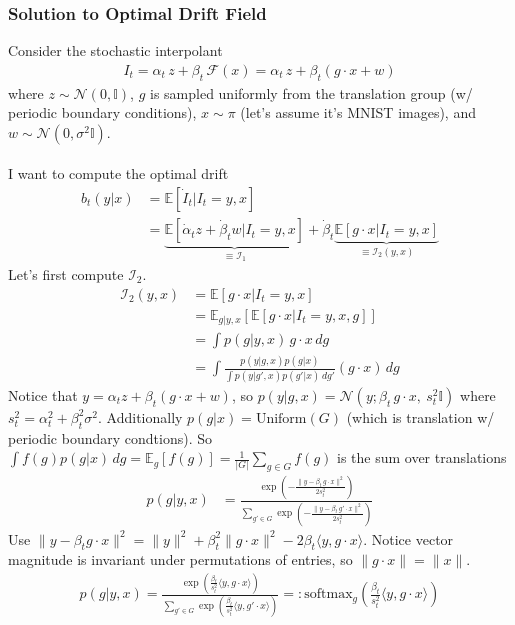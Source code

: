 \documentclass[12pt,fleqn]{article}
\numberwithin{equation}{section}
\begin{document}
\subsubsection{Solution to Optimal Drift Field}
Consider the stochastic interpolant
\begin{align}
	I_t = \alpha_t \, z + \beta_t \, \mathcal F(x) = \alpha_t \, z + \beta_t(g\cdot x + w)
\end{align}
where $z \sim \mathcal N(0, \mathbb I)$, $g$ is sampled uniformly from the translation group (w/ periodic boundary conditions), $x \sim \pi$ (let's assume it's MNIST images), and $w \sim \mathcal N(0, \sigma^2 \mathbb I)$.
\\
\\
I want to compute the optimal drift
\begin{align}
	b_t(y|x) & = \mathbb E[\dot I_t | I_t=y ,x]\\
	& = \underbrace{\mathbb E[\dot \alpha_t z + \dot \beta_t w| I_t = y,x]}_{\equiv \mathcal I_1} + \dot \beta_t \underbrace{\mathbb E[g \cdot x|I_t = y ,x]}_{\equiv \mathcal I_2(y,x)} \label{eqn:optdrift}
\end{align}
Let's first compute $\mathcal I_2$.
\begin{align}
	\mathcal I_2(y,x) & = \mathbb E[g \cdot x | I_t = y,x]\\
	& = \mathbb E_{g | y,x}[\mathbb E[g\cdot x | I_t = y, x, g]]\\
	& = \int p(g|y,x) \, g\cdot x \, dg\\
	& = \int \frac{p(y|g,x) p(g|x)}{\int p(y|g',x) p(g'|x)\, dg'} (g\cdot x) \, dg
\end{align}
Notice that $y = \alpha_t z + \beta_t (g \cdot x +w)$, so $p(y|g,x) = \mathcal N(y ; \beta_t \, g \cdot x , \ s_t^2 \mathbb I)$ where $s_t^2 = \alpha_t^2 + \beta_t^2 \sigma^2$. Additionally $p(g|x) = \text{Uniform}(G)$ (which is translation w/ periodic boundary condtions). So $\int f(g) p(g|x) \, dg = \mathbb E_g[f(g)] = \frac{1}{|G|} \sum_{g \in G} f(g)$ is the sum over translations
\begin{align}
	p(g|y,x)& = \frac{\exp \left(-\frac{\|y - \beta_t \, g\cdot x\|^2}{2 s_t^2} \right)}{\sum_{g' \in G} \exp \left(-\frac{\|y - \beta_t \, g' \cdot x\|^2}{2 s_t^2} \right)}
\end{align}
Use $\|y - \beta_t g\cdot x\|^2 = \|y\|^2 + \beta_t^2 \|g\cdot x\|^2 - 2 \beta_t \langle y, g \cdot x\rangle$. Notice vector magnitude is invariant under permutations of entries, so $\|g \cdot x\| = \|x\|$.
\begin{align}
	p(g|y,x) = \frac{\exp \left( \frac{\beta_t}{s_t^2} \langle y, g \cdot x\rangle \right)}{\sum_{g' \in G} \exp \left( \frac{\beta_t}{s_t^2} \langle y, g' \cdot x\rangle \right)} =: \text{softmax}_g \left( \frac{\beta_t}{s_t^2} \langle y, g \cdot x\rangle  \right)
\end{align}
\end{document}
